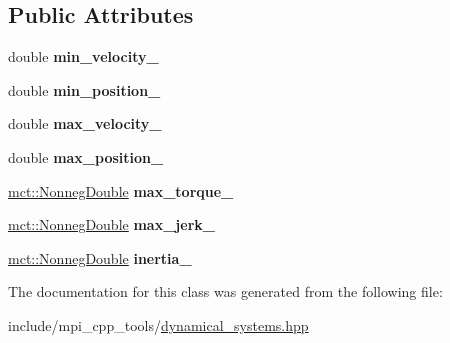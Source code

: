 \subsection*{Public Attributes}
\begin{DoxyCompactItemize}
\item 
double {\bfseries min\+\_\+velocity\+\_\+}\hypertarget{classmct_1_1SafetyConstraint_ae32fca1b6c738c3a3f101feb2fec5785}{}\label{classmct_1_1SafetyConstraint_ae32fca1b6c738c3a3f101feb2fec5785}

\item 
double {\bfseries min\+\_\+position\+\_\+}\hypertarget{classmct_1_1SafetyConstraint_afbec12a6f80368bb9e2b25de92dedcf2}{}\label{classmct_1_1SafetyConstraint_afbec12a6f80368bb9e2b25de92dedcf2}

\item 
double {\bfseries max\+\_\+velocity\+\_\+}\hypertarget{classmct_1_1SafetyConstraint_affeefa06a5a89e777f0779622cc21edc}{}\label{classmct_1_1SafetyConstraint_affeefa06a5a89e777f0779622cc21edc}

\item 
double {\bfseries max\+\_\+position\+\_\+}\hypertarget{classmct_1_1SafetyConstraint_a8b90d0a57f869e4cadec366aad397bcd}{}\label{classmct_1_1SafetyConstraint_a8b90d0a57f869e4cadec366aad397bcd}

\item 
\hyperlink{classmct_1_1NonnegDouble}{mct\+::\+Nonneg\+Double} {\bfseries max\+\_\+torque\+\_\+}\hypertarget{classmct_1_1SafetyConstraint_a9a7b128dcd64b5105f86d027b665ca02}{}\label{classmct_1_1SafetyConstraint_a9a7b128dcd64b5105f86d027b665ca02}

\item 
\hyperlink{classmct_1_1NonnegDouble}{mct\+::\+Nonneg\+Double} {\bfseries max\+\_\+jerk\+\_\+}\hypertarget{classmct_1_1SafetyConstraint_a0a50dbf6329aa075ba85fa60bd3b17dc}{}\label{classmct_1_1SafetyConstraint_a0a50dbf6329aa075ba85fa60bd3b17dc}

\item 
\hyperlink{classmct_1_1NonnegDouble}{mct\+::\+Nonneg\+Double} {\bfseries inertia\+\_\+}\hypertarget{classmct_1_1SafetyConstraint_affdcd5e2e62a8445fd02d83b7308fc6f}{}\label{classmct_1_1SafetyConstraint_affdcd5e2e62a8445fd02d83b7308fc6f}

\end{DoxyCompactItemize}


The documentation for this class was generated from the following file\+:\begin{DoxyCompactItemize}
\item 
include/mpi\+\_\+cpp\+\_\+tools/\hyperlink{dynamical__systems_8hpp}{dynamical\+\_\+systems.\+hpp}\end{DoxyCompactItemize}
